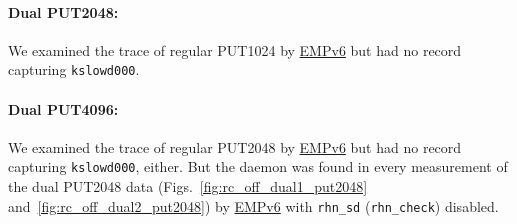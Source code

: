 \documentclass[10pt]{article}
\begin{document}
\paragraph{Dual PUT2048:}
We examined the trace of regular PUT1024 by \underline{EMPv6} 
but had no record capturing {\tt kslowd000}.

\paragraph{Dual PUT4096:} 
We examined the trace of regular PUT2048 by \underline{EMPv6} 
but had no record capturing {\tt kslowd000}, either. 
But the daemon was found in 
every measurement of the dual PUT2048 data (Figs.~\ref{fig:rc_off_dual1_put2048} and~\ref{fig:rc_off_dual2_put2048}) by \underline{EMPv6} with {\tt rhn\_sd} ({\tt rhn\_check}) disabled.
\end{document}

